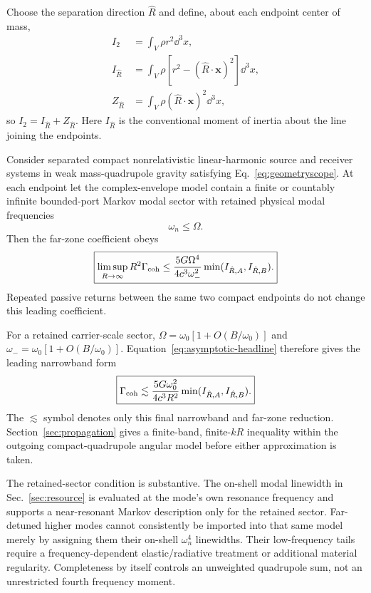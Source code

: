 Choose the separation direction $\hat R$ and define, about each endpoint center of mass,
\begin{align}
I_2&=\int_V\rho r^2\dd^3x,\\
I_{\hat R}&=\int_V\rho\left[r^2-(\hat R\cdot\bm x)^2\right]\dd^3x,\\
Z_{\hat R}&=\int_V\rho(\hat R\cdot\bm x)^2\dd^3x ,
\end{align}
so $I_2=I_{\hat R}+Z_{\hat R}$. Here $I_{\hat R}$ is the conventional moment of inertia about the line joining the endpoints.

\begin{theorem}
Consider separated compact nonrelativistic linear-harmonic source and receiver systems in weak mass-quadrupole gravity satisfying Eq.~\eqref{eq:geometryscope}. At each endpoint let the complex-envelope model contain a finite or countably infinite bounded-port Markov modal sector with retained physical modal frequencies
\begin{equation}
\omega_n\le\Omega .
\label{eq:retainedsector}
\end{equation}
Then the far-zone coefficient obeys
\begin{equation}
\boxed{
\limsup_{R\rightarrow\infty}
R^2\Gamma_{\rm coh}
\le
\frac{5G\Omega^4}{4c^3\omega_-^2}
\min(I_{\hat R,A},I_{\hat R,B}) .
}
\label{eq:asymptotic-headline}
\end{equation}
Repeated passive returns between the same two compact endpoints do not change this leading coefficient.
\end{theorem}

For a retained carrier-scale sector, $\Omega=\omega_0[1+O(B/\omega_0)]$ and $\omega_-=\omega_0[1+O(B/\omega_0)]$. Equation~\eqref{eq:asymptotic-headline} therefore gives the leading narrowband form
\begin{equation}
\boxed{
\Gamma_{\rm coh}
\lesssim
\frac{5G\omega_0^2}{4c^3R^2}
\min(I_{\hat R,A},I_{\hat R,B}) .
}
\label{eq:headline}
\end{equation}
The $\lesssim$ symbol denotes only this final narrowband and far-zone reduction. Section~\ref{sec:propagation} gives a finite-band, finite-$kR$ inequality within the outgoing compact-quadrupole angular model before either approximation is taken.

The retained-sector condition is substantive. The on-shell modal linewidth in Sec.~\ref{sec:resource} is evaluated at the mode's own resonance frequency and supports a near-resonant Markov description only for the retained sector. Far-detuned higher modes cannot consistently be imported into that same model merely by assigning them their on-shell $\omega_n^4$ linewidths. Their low-frequency tails require a frequency-dependent elastic/radiative treatment or additional material regularity. Completeness by itself controls an unweighted quadrupole sum, not an unrestricted fourth frequency moment.

